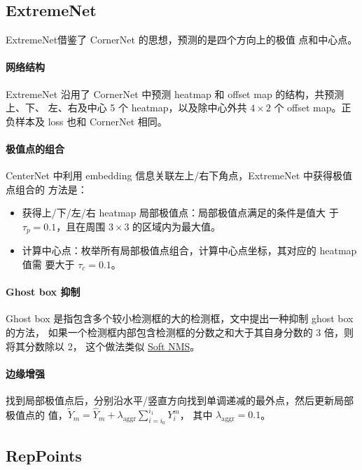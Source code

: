\subsection{ExtremeNet}
\label{sec:ExtremeNet}
ExtremeNet借鉴了 CornerNet 的思想，预测的是四个方向上的极值
点和中心点。

\paragraph{网络结构}
ExtremeNet 沿用了 CornerNet 中预测 heatmap 和 offset map 的结构，共预测上、下、
左、右及中心 5 个 heatmap，以及除中心外共 $4 \times 2$ 个 offset map。正负样本及
loss 也和 CornerNet 相同。

\paragraph{极值点的组合}
CenterNet 中利用 embedding 信息关联左上/右下角点，ExtremeNet 中获得极值点组合的
方法是：

\begin{itemize}
  \item 获得上/下/左/右 heatmap 局部极值点：局部极值点满足的条件是值大
    于 $\tau_p=0.1$，且在周围 $3 \times 3$ 的区域内为最大值。
  \item 计算中心点：枚举所有局部极值点组合，计算中心点坐标，其对应的 heatmap 值需
    要大于 $\tau_c=0.1$。
\end{itemize}

\paragraph{Ghost box 抑制}
Ghost box 是指包含多个较小检测框的大的检测框，文中提出一种抑制 ghost box 的方法，
如果一个检测框内部包含检测框的分数之和大于其自身分数的 3 倍，则将其分数除以 2，
这个做法类似 \hyperref[subsec:soft-nms]{Soft NMS}。

\paragraph{边缘增强}
找到局部极值点后，分别沿水平/竖直方向找到单调递减的最外点，然后更新局部极值点的
值，$\tilde{Y}_m = \hat{Y}_m + \lambda_{\mathrm{aggr}}\sum_{i=i_0}^{i_1}Y_i^m$，
其中 $\lambda_{\mathrm{aggr}}=0.1$。

\subsection{RepPoints}

